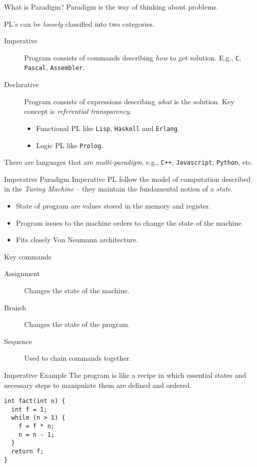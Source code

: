 \documentclass[presentation]{beamer}
\begin{document}
\begin{frame}[fragile,label={sec:orgheadline10}]{What is Paradigm?}
 Paradigm is the way of thinking about problems.

PL's can be \emph{loosely} classified into two categories.
\begin{description}
\item[{Imperative}] Program consists of commands describing \emph{how} to
get solution.  E.g., \texttt{C}, \texttt{Pascal}, \texttt{Assembler}.
\item[{Declarative}] Program consists of expressions describing \emph{what}
        is the solution.  Key concept is \emph{referential transparency}.
\begin{itemize}
\item Functional PL like \texttt{Lisp}, \texttt{Haskell} and \texttt{Erlang}.
\item Logic PL like \texttt{Prolog}.
\end{itemize}
\end{description}

There are languages that are \emph{multi-paradigm}, e.g., \texttt{C++},
\texttt{Javascript}, \texttt{Python}, etc.
\end{frame}

\begin{frame}[label={sec:orgheadline11}]{Imperative Paradigm}
Imperative PL follow the model of computation described in the
\emph{Turing Machine} -- they maintain the fundamental notion of a
\emph{state}.

\begin{itemize}
\item State of program are values stored in the memory and register.
\item Program issues to the machine orders to change the state of the
machine.
\item Fits closely Von Neumann architecture.
\end{itemize}


Key commands
\begin{description}
\item[{Assignment}] Changes the state of the machine.
\item[{Branch}] Changes the state of the program.
\item[{Sequence}] Used to chain commands together.
\end{description}
\end{frame}

\begin{frame}[fragile,label={sec:orgheadline12}]{Imperative Example}
 The program is like a recipe in which essential states and
necessary steps to manipulate them are defined and ordered.

\begin{verbatim}
int fact(int n) {
  int f = 1;
  while (n > 1) {
    f = f * n;
    n = n - 1;
  }
  return f;
}
\end{verbatim}
\end{frame}
\end{document}
